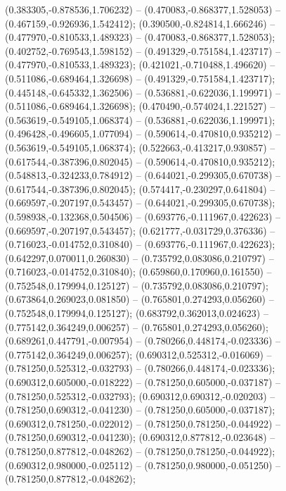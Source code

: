  (0.383305,-0.878536,1.706232) -- (0.470083,-0.868377,1.528053) -- (0.467159,-0.926936,1.542412);
 (0.390500,-0.824814,1.666246) -- (0.477970,-0.810533,1.489323) -- (0.470083,-0.868377,1.528053);
 (0.402752,-0.769543,1.598152) -- (0.491329,-0.751584,1.423717) -- (0.477970,-0.810533,1.489323);
 (0.421021,-0.710488,1.496620) -- (0.511086,-0.689464,1.326698) -- (0.491329,-0.751584,1.423717);
 (0.445148,-0.645332,1.362506) -- (0.536881,-0.622036,1.199971) -- (0.511086,-0.689464,1.326698);
 (0.470490,-0.574024,1.221527) -- (0.563619,-0.549105,1.068374) -- (0.536881,-0.622036,1.199971);
 (0.496428,-0.496605,1.077094) -- (0.590614,-0.470810,0.935212) -- (0.563619,-0.549105,1.068374);
 (0.522663,-0.413217,0.930857) -- (0.617544,-0.387396,0.802045) -- (0.590614,-0.470810,0.935212);
 (0.548813,-0.324233,0.784912) -- (0.644021,-0.299305,0.670738) -- (0.617544,-0.387396,0.802045);
 (0.574417,-0.230297,0.641804) -- (0.669597,-0.207197,0.543457) -- (0.644021,-0.299305,0.670738);
 (0.598938,-0.132368,0.504506) -- (0.693776,-0.111967,0.422623) -- (0.669597,-0.207197,0.543457);
 (0.621777,-0.031729,0.376336) -- (0.716023,-0.014752,0.310840) -- (0.693776,-0.111967,0.422623);
 (0.642297,0.070011,0.260830) -- (0.735792,0.083086,0.210797) -- (0.716023,-0.014752,0.310840);
 (0.659860,0.170960,0.161550) -- (0.752548,0.179994,0.125127) -- (0.735792,0.083086,0.210797);
 (0.673864,0.269023,0.081850) -- (0.765801,0.274293,0.056260) -- (0.752548,0.179994,0.125127);
 (0.683792,0.362013,0.024623) -- (0.775142,0.364249,0.006257) -- (0.765801,0.274293,0.056260);
 (0.689261,0.447791,-0.007954) -- (0.780266,0.448174,-0.023336) -- (0.775142,0.364249,0.006257);
 (0.690312,0.525312,-0.016069) -- (0.781250,0.525312,-0.032793) -- (0.780266,0.448174,-0.023336);
 (0.690312,0.605000,-0.018222) -- (0.781250,0.605000,-0.037187) -- (0.781250,0.525312,-0.032793);
 (0.690312,0.690312,-0.020203) -- (0.781250,0.690312,-0.041230) -- (0.781250,0.605000,-0.037187);
 (0.690312,0.781250,-0.022012) -- (0.781250,0.781250,-0.044922) -- (0.781250,0.690312,-0.041230);
 (0.690312,0.877812,-0.023648) -- (0.781250,0.877812,-0.048262) -- (0.781250,0.781250,-0.044922);
 (0.690312,0.980000,-0.025112) -- (0.781250,0.980000,-0.051250) -- (0.781250,0.877812,-0.048262);
